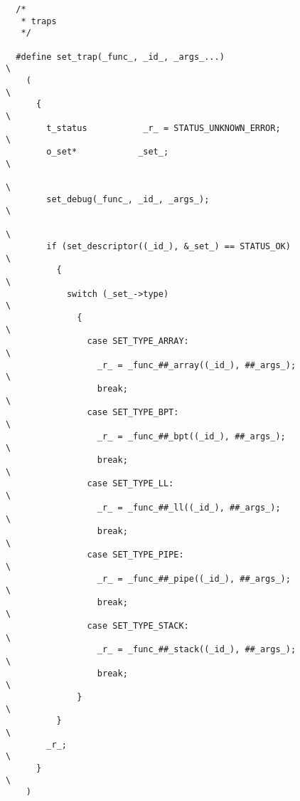 \begin{verbatim}
  /*
   * traps
   */

  #define set_trap(_func_, _id_, _args_...)                               \
    (                                                                     \
      {                                                                   \
        t_status           _r_ = STATUS_UNKNOWN_ERROR;                            \
        o_set*            _set_;                                          \
                                                                          \
        set_debug(_func_, _id_, _args_);                                  \
                                                                          \
        if (set_descriptor((_id_), &_set_) == STATUS_OK)                 \
          {                                                               \
            switch (_set_->type)                                          \
              {                                                           \
                case SET_TYPE_ARRAY:                                      \
                  _r_ = _func_##_array((_id_), ##_args_);                 \
                  break;                                                  \
                case SET_TYPE_BPT:                                        \
                  _r_ = _func_##_bpt((_id_), ##_args_);                   \
                  break;                                                  \
                case SET_TYPE_LL:                                         \
                  _r_ = _func_##_ll((_id_), ##_args_);                    \
                  break;                                                  \
                case SET_TYPE_PIPE:                                       \
                  _r_ = _func_##_pipe((_id_), ##_args_);                  \
                  break;                                                  \
                case SET_TYPE_STACK:                                      \
                  _r_ = _func_##_stack((_id_), ##_args_);                 \
                  break;                                                  \
              }                                                           \
          }                                                               \
        _r_;                                                              \
      }                                                                   \
    )
\end{verbatim}


